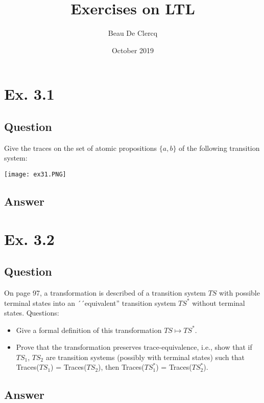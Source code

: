 \documentclass[12pt]{article}
\title{Exercises on LTL}
\author{Beau De Clercq}
\date{October 2019}
\begin{document}
\maketitle{}


\clearpage
\newpage

\section*{Ex. 3.1}
\subsection*{Question}
Give the traces on the set of atomic propositions $\{a,b\}$ of the following transition
system:\\
\begin{centering}
	\texttt{[image: ex31.PNG]}
\end{centering}

\subsection*{Answer}

\newpage

\section*{Ex. 3.2}
\subsection*{Question}
On page 97, a transformation is described of a transition system $TS$ with possible
terminal states into an ´´equivalent'' transition system $TS^*$ without terminal states. Questions:
\begin{itemize}
	\item Give a formal definition of this transformation $TS \mapsto TS^*$.
	\item Prove that the transformation preserves trace-equivalence, i.e., show that if $TS_1$, $TS_2$ are
	transition systems (possibly with terminal states) such that Traces($TS_1$) = Traces($TS_2$),
	then Traces($TS^*_1$) = Traces($TS^*_2$).
\end{itemize}

\subsection*{Answer}
\end{document}
